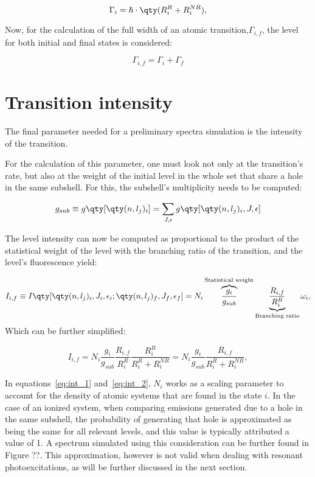 \begin{equation}
    \Gamma_i = \hbar\cdot \qty(R_i^{R}+R_i^{NR}),
\end{equation}

Now, for the calculation of the full width of an atomic transition,$\Gamma_{i,f}$, the level for both initial and final states is considered:

\begin{equation}
    \Gamma_{i,f}=\Gamma_i+\Gamma_f
\end{equation}

\section{Transition intensity}

The final parameter needed for a preliminary spectra simulation is the intensity of the transition.

For the calculation of this parameter, one must look not only at the transition's rate, but also at the weight of the  initial level in the whole set that share a hole in the same subshell. For this, the subshell's multiplicity needs to be computed:

\begin{equation}
    g_{sub}\equiv g\qty[\qty(n,l_j)_i]=\sum_{J,\epsilon}g\qty[\qty(n,l_j)_i,J,\epsilon]
\end{equation}

The level intensity can now be computed as proportional to the product of the statistical weight of the level with the branching ratio of the transition, and the level's fluorescence yield:

\begin{equation}
    I_{i,f}\equiv I\qty[\qty(n,l_j)_i,J_i,\epsilon_i;\qty(n,l_j)_f,J_f,\epsilon_f]=N_i \overbrace{\frac{g_i}{g_{sub}}}^{\text{Statistical weight}} \underbrace{\frac{R_{i,f}}{R^R_i}}_{\text{Branching ratio}}  \omega_i, \label{eq:int_1}
\end{equation}
 Which can be further simplified:

 \begin{equation}
    I_{i,f}=N_i \frac{g_i}{g_{sub}} \frac{R_{i,f}}{R_i^R} \frac{R_i^R}{R_i^R + R_i^{NR}}=N_i \frac{g_i}{g_{sub}} \frac{R_{i,f}}{R_i^R+R_i^{NR}}, \label{eq:int_2}
 \end{equation}

 In equations~\eqref{eq:int_1} and~\eqref{eq:int_2}, $N_i$ works as a scaling parameter to account for the density of atomic systems that are found in the state $i$. In the case of an ionized system, when comparing emissions generated due to a hole in the same subshell, the probability of generating that hole is approximated as being the same for all relevant levels, and this value is typically attributed a value of 1. A spectrum simulated using this consideration can be further found in Figure ??. This approximation, however is not valid when dealing with resonant photoexcitations, as will be further discussed in the next section.
